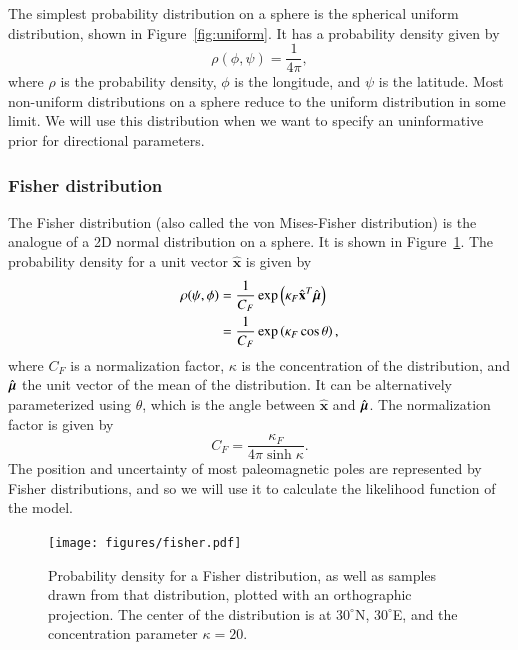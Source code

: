 \documentclass[preprint,12pt,authoryear]{elsarticle}
\newcommand{\mitbf}[1]{\hbox{\mathversion{bold}$#1$}}
\begin{document}
The simplest probability distribution on a sphere is the spherical uniform distribution, shown in Figure~\ref{fig:uniform}.
It has a probability density given by
\begin{equation}
  \rho(\phi, \psi) = \frac{1}{4 \pi},
\end{equation}
where $\rho$ is the probability density, $\phi$ is the longitude, and $\psi$ is the latitude.
Most non-uniform distributions on a sphere reduce to the uniform distribution in some limit.
We will use this distribution when we want to specify an uninformative prior for directional parameters.

\subsubsection{Fisher distribution}
The Fisher distribution (also called the von Mises-Fisher distribution) is the analogue
of a 2D normal distribution on a sphere. It is shown in Figure~\ref{fig:fisher}.
The probability density for a unit vector $\hat{\mathbf{x}}$ is given by
\begin{equation}
  \begin{aligned}
  \rho(\psi, \phi) 
  &= \frac{1}{C_F} \exp \left( \kappa_F \hat{\mathbf{x}}^T \hat{\mitbf{\mu}} \right) \\
  &= \frac{1}{C_F} \exp \left( \kappa_F \cos \theta \right),
  \end{aligned}
\end{equation}
where $C_F$ is a normalization factor, $\kappa$ is the concentration of the distribution, and
$\hat{\mitbf{\mu}}$ the unit vector of the mean of the distribution. It can be alternatively
parameterized using $\theta$, which is the angle between $\hat{\mathbf{x}}$ and $\hat{\mitbf{\mu}}$.
The normalization factor is given by 
\begin{equation}
  C_F = \frac{\kappa_F}{4 \pi \sinh{\kappa}}.
\end{equation}
The position and uncertainty of most paleomagnetic poles are represented by Fisher distributions,
and so we will use it to calculate the likelihood function of the model.

\begin{figure}
\texttt{[image: figures/fisher.pdf]}
\caption{Probability density for a Fisher distribution, as well as samples drawn from that distribution, plotted with an orthographic projection. The center of the distribution is at $30^\circ$N, $30^\circ$E, and the concentration parameter $\kappa=20$.}
\label{fig:fisher}
\end{figure}
\end{document}
